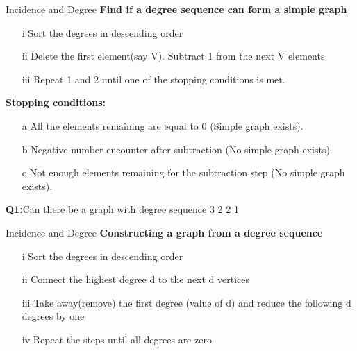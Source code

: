 \documentclass{beamer}
\begin{document}
\begin{frame}{Incidence and Degree}
	\textbf{Find if a degree sequence can form a simple graph}
	\begin{itemize}
		\item[i] Sort the degrees in descending order
		\item[ii] Delete the first element(say V). Subtract 1 from the next V elements.
		\item[iii] Repeat 1 and 2 until one of the stopping conditions is met.
	\end{itemize}
	\textbf{Stopping conditions:}
	\begin{itemize}
		\item[a] All the elements remaining are equal to 0 (Simple graph exists).
		\item[b] Negative number encounter after subtraction (No simple graph exists).
		\item[c] Not enough elements remaining for the subtraction step (No simple graph exists).
	\end{itemize}
\textbf{Q1:}Can there be a graph with degree sequence 3 2 2 1
\end{frame}
\begin{frame}{Incidence and Degree}
	\textbf{Constructing a graph from a degree sequence}
	\begin{itemize}
		\item[i] Sort the degrees in descending order
		\item[ii] Connect the highest degree d to the next d vertices
		\item[iii] Take away(remove) the first degree (value of d) and reduce the 
		following d degrees by one
		\item[iv] Repeat the steps until all degrees are zero
	\end{itemize}
	
\end{frame}
\end{document}
